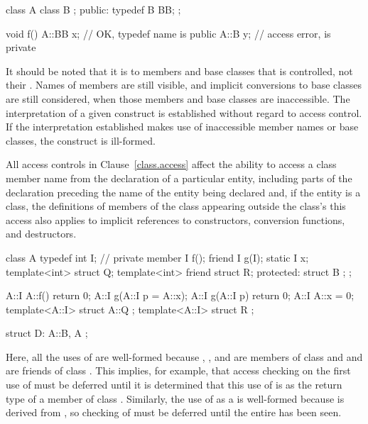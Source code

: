 \begin{codeblock}
class A {
  class B { };
public:
  typedef B BB;
};

void f() {
  A::BB x;          // OK, typedef name  is public
  A::B y;           // access error,  is private
}
\end{codeblock}
\exitnote

\pnum
It should be noted that it is
to members and base classes that is controlled, not their
.
Names of members are still visible, and implicit conversions to base
classes are still considered, when those members and base classes are
inaccessible.
The interpretation of a given construct is
established without regard to access control.
If the interpretation
established makes use of inaccessible member names or base classes,
the construct is ill-formed.

\pnum
All access controls in Clause~\ref{class.access} affect the ability to access a class member
name from the declaration of a particular
entity, including parts of the declaration preceding the name of the entity
being declared and, if the entity is a class, the definitions of members of
the class appearing outside the class's 
\enternote this access also applies to implicit references to constructors,
conversion functions, and destructors. \exitnote
\enterexample

\begin{codeblock}
class A {
  typedef int I;    // private member
  I f();
  friend I g(I);
  static I x;
  template<int> struct Q;
  template<int> friend struct R;
protected:
    struct B { };
};

A::I A::f() { return 0; }
A::I g(A::I p = A::x);
A::I g(A::I p) { return 0; }
A::I A::x = 0;
template<A::I> struct A::Q { };
template<A::I> struct R { };

struct D: A::B, A { };
\end{codeblock}

\pnum
Here, all the uses of
are well-formed because
,
, and 
are members of class
and
and  are friends of class
.
This implies, for example, that access checking on the first use of
must be deferred until it is determined that this use of
is as the return type of a member of class
.
Similarly, the use of  as a
 is well-formed because 
is derived from , so checking of 
must be deferred until the entire  has been seen.
\exitexample

